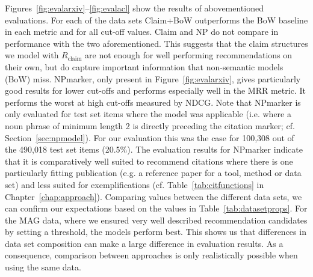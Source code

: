 Figures~\ref{fig:evalarxiv}--\ref{fig:evalacl} show the results of abovementioned evaluations. For each of the data sets Claim+BoW outperforms the BoW baseline in each metric and for all cut-off values. Claim and NP do not compare in performance with the two aforementioned. This suggests that the claim structures we model with $R_{\text{claim}}$ are not enough for well performing recommendations on their own, but do capture important information that non-semantic models (BoW) miss. NPmarker, only present in Figure~\ref{fig:evalarxiv}, gives particularly good results for lower cut-offs and performs especially well in the MRR metric. It performs the worst at high cut-offs measured by NDCG. Note that NPmarker is only evaluated for test set items where the model was applicable (i.e. where a noun phrase of minimum length 2 is directly preceding the citation marker; cf. Section~\ref{sec:npmodel}). For our evaluation this was the case for 100,308 out of the 490,018 test set items (20.5\%). The evaluation results for NPmarker indicate that it is comparatively well suited to recommend citations where there is one particularly fitting publication (e.g. a reference paper for a tool, method or data set) and less suited for exemplifications (cf. Table~\ref{tab:citfunctions} in Chapter~\ref{chap:approach}). Comparing values between the different data sets, we can confirm our expectations based on the values in Table~\ref{tab:datasetprops}. For the MAG data, where we ensured very well described recommendation candidates by setting a threshold, the models perform best.
This shows us that differences in data set composition can make a large difference in evaluation results. As a consequence, comparison between approaches is only realistically possible when using the same data.




